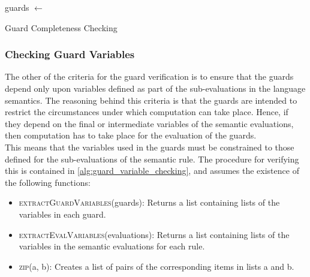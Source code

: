 \begin{algorithm}
\begin{algorithmic}
    \State guards $\gets$ 
            \State {}
        \EndIf
    \EndFor
    \State {}
\EndFunction
\end{algorithmic}
\caption{Guard Completeness Checking}
\label{alg:guard_completeness_checking}
\end{algorithm}


\subsubsection{Checking Guard Variables} %
\label{ssub:checking_guard_variables}
The other of the criteria for the guard verification is to ensure that the guards depend only upon variables defined as part of the sub-evaluations in the language semantics.
The reasoning behind this criteria is that the guards are intended to restrict the circumstances under which computation can take place. 
Hence, if they depend on the final or intermediate variables of the semantic evaluations, then computation has to take place for the evaluation of the guards.\\

This means that the variables used in the guards must be constrained to those defined for the sub-evaluations of the semantic rule.
The procedure for verifying this is contained in \autoref{alg:guard_variable_checking}, and assumes the existence of the following functions:
\begin{itemize}
    \item \textsc{extractGuardVariables}(guards): Returns a list containing lists of the variables in each guard.
    \item \textsc{extractEvalVariables}(evaluations): Returns a list containing lists of the variables in the semantic evaluations for each rule.
    \item \textsc{zip}(a, b): Creates a list of pairs of the corresponding items in lists a and b.
\end{itemize}

